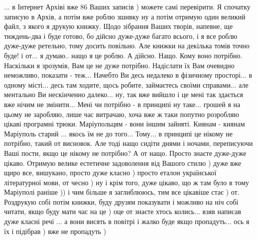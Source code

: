  
 
 
 
 

... в Інтернет Архіві вже 86 Ваших записів ) можете самі перевірити. Я спочатку
записую в Архів, а потім вже роблю зшивку ну а потім отримую один великий файл,
з якого я друкую книжку. Щодо зібрання Ваших творів, напевне, ще тиждень-два і
буде готово, бо дійсно дуже-дуже багато всього, і я все роблю дуже-дуже
ретельно, тому досить повільно. Але книжки на декілька томів точно буде! і от... я думаю.. нащо я
це роблю. А дійсно. Нащо. Кому воно потрібно. Наскільки я зрозумів, Вам це не
дуже потрібно. Надіслати їх Вам очевидно неможливо, показати - теж... Начебто Ви десь недалеко в фізичному просторі... в одному місті...
десь там ходите, щось робите, займаєтесь своїми справами...
але ментально Ви нескінченно далеко... ну, так вже вийшло і це мені так здається вже нічим не змінити... Мені чи потрібно - в принципі ну таке... грошей я на цьому не заробляю, лише
час витрачаю, хоча вже ж таки попутно розробляю цікаві програмні трюки. Маріупольцям - вони іншим зайняті. Киянам - киянам Маріуполь
старий ... якось їм не до того... Тому... в принципі це нікому не потрібно,
такий от висновок. Але тоді нащо сидіти днями і ночами, переписуючи Ваші пости, якщо це нікому не потрібно?
А от нащо. Просто знаєте дуже-дуже цікаво. Отримую велике естетичне задоволення від Вашого стилю )
дуже вже щиро все, вишукано, просто дуже класно ) просто еталон української літературної мови, от чесно ) 
ну і крім того, дуже цікаво, що ж там було в тому Маріуполі раніше )) і чим більше я заглиблююсь, тим все цікавіше стає )
от. Роздрукую собі потім книжки, буду друзям показувати і можливо на ніч
собі читати, якщо буду мати час на це ) оце от знаєте хтось колись... взяв написав дуже класні речі ...
а вони висять в повітрі і жалко буде якщо пропадуть... ось я їх і підібрав ) вже не пропадуть )
